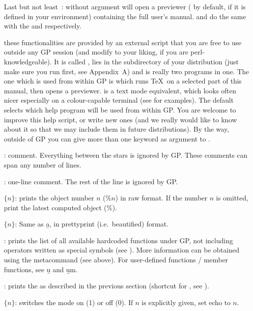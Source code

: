 Last but not least~:  without argument will open a 
previewer ( by default,  if it is defined in your
environment) containing the full user's manual.  and
 do the same with the  and 
respectively.

 these functionalities are provided by an
external  script that you are free to use outside any GP session
(and modify to your liking, if you are perl-knowledgeable). It is called
, lies in the  subdirectory of your distribution
(just make sure you run  first, see Appendix~A) and is
really two programs in one. The one which is used from within GP is
 which runs \TeX\ on a selected part of this manual, then opens
a previewer.  is a text mode equivalent, which looks
often nicer especially on a colour-capable terminal (see
 for examples). The default  selects which
help program will be used from within GP. You are welcome to improve this
help script, or write new ones (and we really would like to know about it
so that we may include them in future distributions). By the way, outside
of GP you can give more than one keyword as argument to .

: comment. Everything between the stars is ignored by
GP. These comments can span any number of lines.

\subseckbd{\bs\bs}: one-line comment. The rest of the line
is ignored by GP.

 $\{n\}$: prints the object number $n$ ($\%n$)
in raw format. If the number $n$ is omitted, print the latest computed object
($\%$). \label{se:history}

 $\{n\}$: Same as \b{a}, in prettyprint (i.e.~beautified)
format.

: prints the list of all available
hardcoded functions under GP, not including operators written as special
symbols (see ). More information can be obtained using
the  metacommand (see above). For user-defined functions / member
functions, see \b{u} and \b{um}.

: prints the  as described in the
previous section (shortcut for , see ).

 $\{n\}$: switches the  mode on (1) or off (0). If
$n$ is explicitly given, set echo to $n$.


